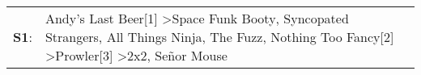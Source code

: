 \begin{supertabular}{p{0.03\textwidth}p{0.92\textwidth}}
 \textbf{S1}:  &  Andy's Last Beer[1]\textsuperscript{} \textgreater \enspace Space Funk Booty\textsuperscript{}, \enspace Syncopated Strangers\textsuperscript{}, \enspace All Things Ninja\textsuperscript{}, \enspace The Fuzz\textsuperscript{}, \enspace Nothing Too Fancy[2]\textsuperscript{} \textgreater \enspace Prowler[3]\textsuperscript{} \textgreater \enspace 2x2\textsuperscript{}, \enspace Señor Mouse\textsuperscript{}  \enspace  \\
\end{supertabular}
